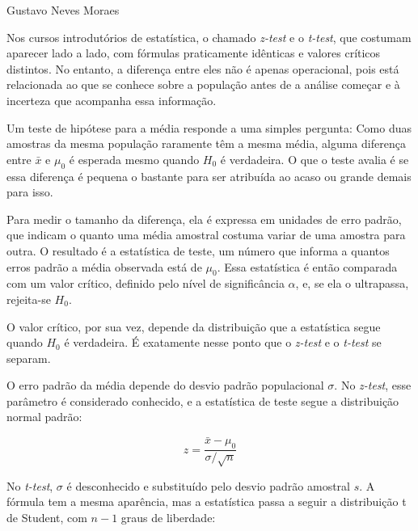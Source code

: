 {Gustavo Neves Moraes}
{

\hspace*{1.5em}
Nos cursos introdutórios de estatística, o chamado \textit{z-test} e o \textit{t-test}, que costumam aparecer lado a lado,
com fórmulas praticamente idênticas e valores críticos distintos.
No entanto, a diferença entre eles não é apenas operacional,
pois está relacionada ao que se conhece sobre a população antes de a análise começar
e à incerteza que acompanha essa informação.

\subtitle{O teste de hipótese para a média}

\hspace*{1.5em}
Um teste de hipótese para a média responde a uma simples pergunta:
Como duas amostras da mesma população raramente têm a mesma média,
alguma diferença entre $\bar{x}$ e $\mu_0$ é esperada mesmo quando $H_0$ é verdadeira.
O que o teste avalia é se essa diferença é pequena o bastante para ser atribuída ao acaso
ou grande demais para isso.

\hspace*{1.5em}
Para medir o tamanho da diferença, ela é expressa em unidades de erro padrão,
que indicam o quanto uma média amostral costuma variar de uma amostra para outra.
O resultado é a estatística de teste,
um número que informa a quantos erros padrão a média observada está de $\mu_0$.
Essa estatística é então comparada com um valor crítico, definido pelo nível de significância $\alpha$,
e, se ela o ultrapassa, rejeita-se $H_0$.

\hspace*{1.5em}
O valor crítico, por sua vez, depende da distribuição que a estatística segue quando $H_0$ é verdadeira.
É exatamente nesse ponto que o \textit{z-test} e o \textit{t-test} se separam.

\subtitle{Dois testes, uma diferença}

\hspace*{1.5em}
O erro padrão da média depende do desvio padrão populacional $\sigma$.
No \textit{z-test}, esse parâmetro é considerado conhecido,
e a estatística de teste segue a distribuição normal padrão:

\[
z = \frac{\bar{x} - \mu_0}{\sigma / \sqrt{n}}
\]

\hspace*{1.5em}
No \textit{t-test}, $\sigma$ é desconhecido e substituído pelo desvio padrão amostral $s$.
A fórmula tem a mesma aparência, mas a estatística passa a seguir a distribuição t de Student,
com $n - 1$ graus de liberdade:

}
